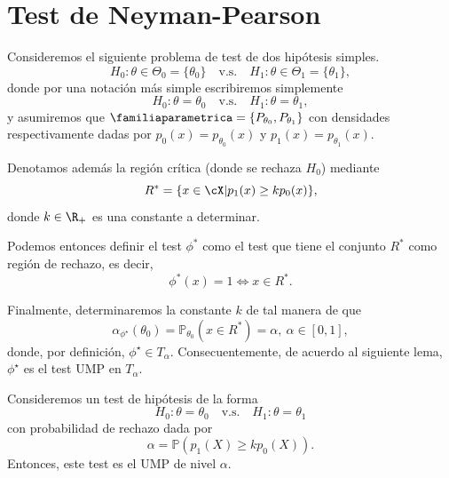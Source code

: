 \section{Test de Neyman-Pearson} 
\label{sub:test_de_neyman_pearson}
Consideremos el siguiente problema de test de dos hipótesis simples. 
\begin{equation}
	H_0:\theta\in\Theta_0=\{\theta_0\}\quad \text{v.s.}\quad H_1:\theta\in\Theta_1=\{\theta_1\},
\end{equation}
donde por una notación más simple escribiremos simplemente 
\begin{equation}
	H_0:\theta =\theta_0\quad \text{v.s.}\quad H_1:\theta = \theta_1,		
\end{equation}
y asumiremos que $\familiaparametrica=\{P_{\theta_0},P_{\theta_1}\}$ con densidades respectivamente dadas por $p_0(x) = p_{\theta_0}(x)$ y $p_1(x) = p_{\theta_1}(x)$.

Denotamos además la región crítica (donde se rechaza $H_0$) mediante
\begin{equation}
	\label{eq:R_NR}
	R^* = \{x\in\cX | p_1(x) \geq k p_0(x)\},
\end{equation}
donde $k\in\R_+$ es una constante a determinar. 

Podemos entonces definir el test $\phi^*$ como el test que tiene el conjunto $R^*$ como región de rechazo, es decir, 
\begin{equation}
	\phi^*(x) = 1 \Leftrightarrow x\in R^*.
\end{equation}

Finalmente, determinaremos la constante $k$ de tal manera de que 
\begin{equation}
	\alpha_{\phi^\star}(\theta_0) = \mathbb{P}_{\theta_0}(x\in R^*) = \alpha,\ \alpha\in[0,1], 
\end{equation}
donde, por definición, $\phi^\star\in T_\alpha$. Consecuentemente, de acuerdo al siguiente lema, $\phi^\star$ es el test UMP en $T_\alpha$.

\begin{lemma}
	Consideremos un test de hipótesis de la forma 
	\begin{equation}
		H_0:\theta =\theta_0\quad \text{v.s.}\quad H_1:\theta = \theta_1
	\end{equation}
	con probabilidad de rechazo dada por
	\begin{equation}
			\alpha = \mathbb{P}(p_1(X)\geq k p_0(X)).
		\end{equation}
	Entonces, este test es el UMP de nivel $\alpha$.
\end{lemma}

